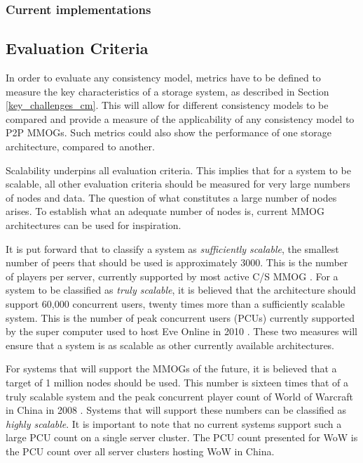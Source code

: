 \documentclass[10pt,a4paper,journal,cspaper,compsoc]{IEEEtran}
\begin{document}
\subsubsection{Current implementations}

\subsection{Evaluation Criteria} \label{eval_crit}

In order to evaluate any consistency model, metrics have to be defined to measure the key characteristics of a storage system, as described in
Section \ref{key_challenges_cm}. This will allow for different consistency models to be compared and provide a measure of the applicability of any
consistency model to P2P MMOGs. Such metrics could also show the performance of one storage architecture, compared to another.

Scalability underpins all evaluation criteria. This implies that for a system to be scalable, all other evaluation criteria should be measured for
very large numbers of nodes and data. The question of what constitutes a large number of nodes arises. To establish what an adequate number of nodes
is, current MMOG architectures can be used for inspiration.

It is put forward that to classify a system as \emph{sufficiently scalable}, the smallest number of peers that should be used is approximately 3000.
This is the number of players per server, currently supported by most active C/S MMOG \cite{}. For a system to be classified as \emph{truly
scalable}, it is believed that the architecture should support 60,000 concurrent users, twenty times more than a sufficiently scalable system. This
is the number of peak concurrent users (PCUs) currently supported by the super computer used to host Eve Online in 2010 \cite{eve_pcu}. These two
measures will ensure that a system is as scalable as other currently available architectures.

For systems that will support the MMOGs of the future, it is believed that a target of 1 million nodes should be used. This number is sixteen times
that of a truly scalable system and the peak concurrent player count of World of Warcraft in China in 2008 \cite{WoW_china_pcu}. Systems that will
support these numbers can be classified as \emph{highly scalable}. It is important to note that no current systems support such a large PCU count on
a single server cluster. The PCU count presented for WoW is the PCU count over all server clusters hosting WoW in China.
\end{document}
